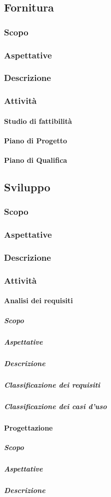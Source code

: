 \documentclass[../norme-di-progetto.tex]{subfiles}
\begin{document}
\subsection{Fornitura}
\subsubsection{Scopo}
\subsubsection{Aspettative}
\subsubsection{Descrizione}
\subsubsection{Attività}
\paragraph{Studio di fattibilità}
\paragraph{Piano di Progetto}
\paragraph{Piano di Qualifica}

\subsection{Sviluppo}
\subsubsection{Scopo}
\subsubsection{Aspettative}
\subsubsection{Descrizione}
\subsubsection{Attività}
\paragraph{Analisi dei requisiti}
\subparagraph*{Scopo}
\subparagraph*{Aspettative}
\subparagraph*{Descrizione}
\subparagraph*{Classificazione dei requisiti}
\subparagraph*{Classificazione dei casi d'uso}
\paragraph{Progettazione}
\subparagraph*{Scopo}
\subparagraph*{Aspettative}
\subparagraph*{Descrizione}

\newpage
\end{document}
